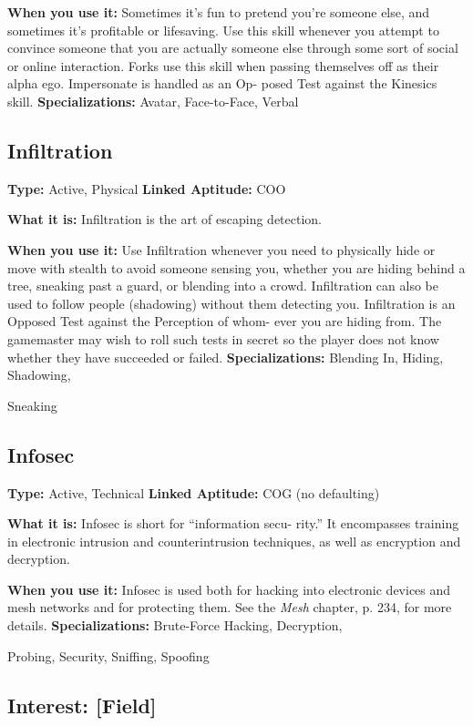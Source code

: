 \textbf{When you use it:} Sometimes it's fun to pretend 
you're someone else, and sometimes it's profitable 
or lifesaving. Use this skill whenever you attempt 
to convince someone that you are actually someone 
else through some sort of social or online interaction. 
Forks use this skill when passing themselves off as 
their alpha ego. Impersonate is handled as an Op-
posed Test against the Kinesics skill.
\textbf{Specializations:} Avatar, Face-to-Face, Verbal

\subsection{Infiltration}

\textbf{Type:} Active, Physical
\textbf{Linked Aptitude:} COO

\textbf{What it is:} Infiltration is the art of escaping 
detection.

\textbf{When you use it:} Use Infiltration whenever you 
need to physically hide or move with stealth to avoid 
someone sensing you, whether you are hiding behind 
a tree, sneaking past a guard, or blending into a 
crowd. Infiltration can also be used to follow people 
(shadowing) without them detecting you. Infiltration 
is an Opposed Test against the Perception of whom-
ever you are hiding from. The gamemaster may wish 
to roll such tests in secret so the player does not know 
whether they have succeeded or failed.
\textbf{Specializations:} Blending In, Hiding, Shadowing, 

Sneaking

\subsection{Infosec}

\textbf{Type:} Active, Technical
\textbf{Linked Aptitude:} COG (no defaulting)

\textbf{What it is:} Infosec is short for ``information secu-
rity.'' It encompasses training in electronic intrusion 
and counterintrusion techniques, as well as encryption 
and decryption.

\textbf{When you use it:} Infosec is used both for hacking 
into electronic devices and mesh networks and for 
protecting them. See the \textit{Mesh} chapter, p. 234, for 
more details.
\textbf{Specializations:} Brute-Force Hacking, Decryption, 

Probing, Security, Sniffing, Spoofing

\subsection{Interest: [Field]}

